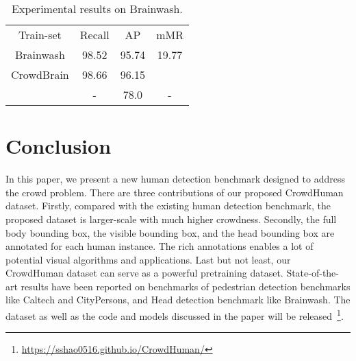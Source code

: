 \documentclass[10pt,twocolumn,letterpaper]{article}
\begin{document}
\setlength{\tabcolsep}{4pt}
\begin{table}
\begin{center}
\caption{Experimental results on Brainwash.}
\label{table:brainwash}
\begin{tabular}{cccc}
\hline\noalign{\smallskip}
{Train-set} & Recall & AP & mMR\\
\noalign{\smallskip}
\hline
\noalign{\smallskip}
Brainwash & {98.52} & {95.74} & {19.77}\\
CrowdBrain & {98.66}  & {96.15} & {}\\
\hline
\hline
\cite{stewart2016end} & - & {78.0} & -\\
\hline
\end{tabular}
\end{center}
\end{table}
\setlength{\tabcolsep}{1.4pt}




\section{Conclusion}
In this paper, we present a new human detection benchmark designed to address the crowd problem. There are three contributions of our proposed CrowdHuman dataset. Firstly, compared with the existing human detection benchmark, the proposed dataset is larger-scale with much higher crowdness. Secondly, the full body bounding box, the visible bounding box, and the head bounding box are annotated for each human instance. The rich annotations enables a lot of potential visual algorithms and applications. Last but not least, our CrowdHuman dataset can serve as a powerful pretraining dataset. State-of-the-art results have been reported on benchmarks of pedestrian detection benchmarks like Caltech and CityPersons, and Head detection benchmark like Brainwash. The dataset as well as the code and models discussed in the paper will be released~\footnote{\url{https://sshao0516.github.io/CrowdHuman/}}.


{\small


}
\end{document}
